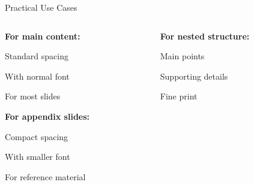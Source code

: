 \documentclass[11pt,compress,t,notes=noshow, xcolor=table]{beamer}
\begin{document}
\begin{frame}{Practical Use Cases}
  \begin{columns}[T]
    \begin{column}{0.48\textwidth}
      \textbf{For main content:}
      \begin{itemizeM}
        \item Standard spacing
        \item With normal font
        \item For most slides
      \end{itemizeM}
      
      \vspace{0.3cm}
      \textbf{For appendix slides:}
      \begin{itemizeS}[small]
        \item Compact spacing
        \item With smaller font
        \item For reference material
      \end{itemizeS}
    \end{column}
    
    \begin{column}{0.48\textwidth}
      \textbf{For nested structure:}
      \begin{kitemize}[fs=normalsize,sep=M]
        \item Main points
        \begin{kitemize}[fs=small,sep=S]
          \item Supporting details
          \begin{kitemize}[fs=footnotesize,sep=S]
            \item Fine print
          \end{kitemize}
        \end{kitemize}
      \end{kitemize}
    \end{column}
  \end{columns}
\end{frame}

\endlecture
\end{document}
